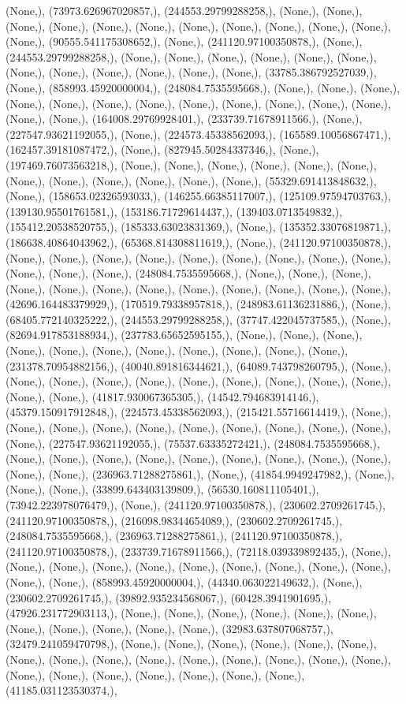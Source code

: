 \documentclass{article}
\begin{document}
(None,), (73973.626967020857,), (244553.29799288258,), (None,), (None,), (None,), (None,), (None,), (None,), (None,), (None,), (None,), (None,), (None,), (None,), (90555.541175308652,), (None,), (241120.97100350878,), (None,), (244553.29799288258,), (None,), (None,), (None,), (None,), (None,), (None,), (None,), (None,), (None,), (None,), (None,), (None,), (33785.386792527039,), (None,), (858993.45920000004,), (248084.7535595668,), (None,), (None,), (None,), (None,), (None,), (None,), (None,), (None,), (None,), (None,), (None,), (None,), (None,), (None,), (164008.29769928401,), (233739.71678911566,), (None,), (227547.93621192055,), (None,), (224573.45338562093,), (165589.10056867471,), (162457.39181087472,), (None,), (827945.50284337346,), (None,), (197469.76073563218,), (None,), (None,), (None,), (None,), (None,), (None,), (None,), (None,), (None,), (None,), (None,), (None,), (55329.691413848632,), (None,), (158653.02326593033,), (146255.66385117007,), (125109.97594703763,), (139130.95501761581,), (153186.71729614437,), (139403.0713549832,), (155412.20538520755,), (185333.63023831369,), (None,), (135352.33076819871,), (186638.40864043962,), (65368.814308811619,), (None,), (241120.97100350878,), (None,), (None,), (None,), (None,), (None,), (None,), (None,), (None,), (None,), (None,), (None,), (None,), (248084.7535595668,), (None,), (None,), (None,), (None,), (None,), (None,), (None,), (None,), (None,), (None,), (None,), (None,), (42696.164483379929,), (170519.79338957818,), (248983.61136231886,), (None,), (68405.772140325222,), (244553.29799288258,), (37747.422045737585,), (None,), (82694.917853188934,), (237783.65652595155,), (None,), (None,), (None,), (None,), (None,), (None,), (None,), (None,), (None,), (None,), (None,), (231378.70954882156,), (40040.891816344621,), (64089.743798260795,), (None,), (None,), (None,), (None,), (None,), (None,), (None,), (None,), (None,), (None,), (None,), (None,), (41817.930067365305,), (14542.794683914146,), (45379.150917912848,), (224573.45338562093,), (215421.55716614419,), (None,), (None,), (None,), (None,), (None,), (None,), (None,), (None,), (None,), (None,), (None,), (227547.93621192055,), (75537.63335272421,), (248084.7535595668,), (None,), (None,), (None,), (None,), (None,), (None,), (None,), (None,), (None,), (None,), (None,), (236963.71288275861,), (None,), (41854.9949247982,), (None,), (None,), (None,), (33899.643403139809,), (56530.160811105401,), (73942.223978076479,), (None,), (241120.97100350878,), (230602.2709261745,), (241120.97100350878,), (216098.98344654089,), (230602.2709261745,), (248084.7535595668,), (236963.71288275861,), (241120.97100350878,), (241120.97100350878,), (233739.71678911566,), (72118.039339892435,), (None,), (None,), (None,), (None,), (None,), (None,), (None,), (None,), (None,), (None,), (None,), (None,), (858993.45920000004,), (44340.063022149632,), (None,), (230602.2709261745,), (39892.935234568067,), (60428.3941901695,), (47926.231772903113,), (None,), (None,), (None,), (None,), (None,), (None,), (None,), (None,), (None,), (None,), (None,), (32983.637807068757,), (32479.241059470798,), (None,), (None,), (None,), (None,), (None,), (None,), (None,), (None,), (None,), (None,), (None,), (None,), (None,), (None,), (None,), (None,), (None,), (None,), (None,), (None,), (None,), (None,), (41185.031123530374,), 
\end{document}

